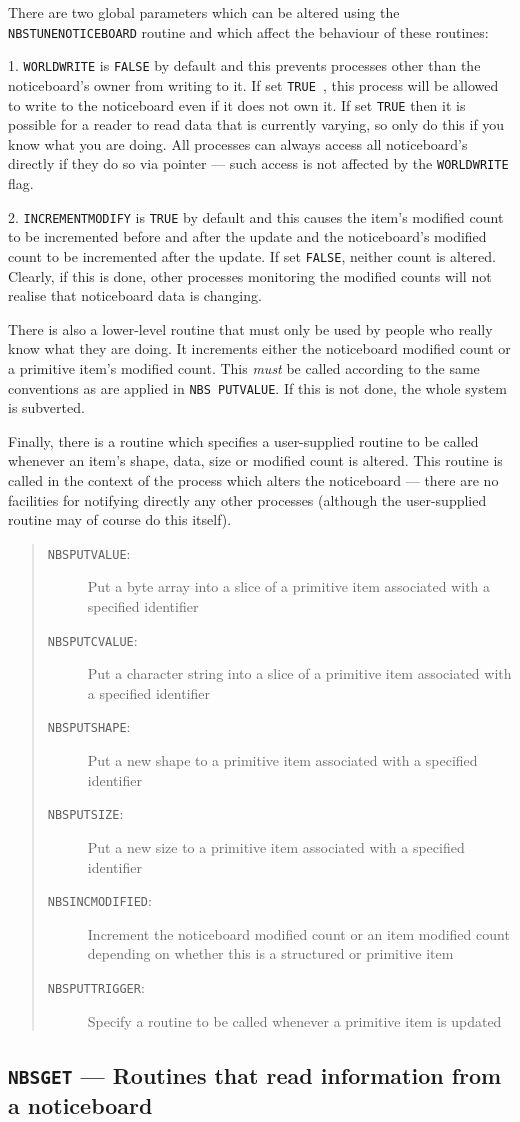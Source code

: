 \documentclass[twoside,11pt]{article}
\renewcommand{\_}{\texttt{\symbol{95}}}
\newcommand{\mansection}[2]{\subsection{#1 --- #2}}
\newenvironment{mansectionroutines}{\begin{quote}\begin{description}}%
{\end{description}\end{quote}}
\newcommand{\mansectionitem}[1]{\item[#1:]\mbox{}}
\newcommand{\mantt}{\tt}
\begin{document}
      There are two global parameters which can be altered using the
      {\mantt{NBS\_TUNE\_NOTICEBOARD}} routine and which affect the behaviour %
of these
      routines:

      1. {\mantt{WORLD\_WRITE}} is {\mantt{FALSE}} by default and this %
prevents processes other
         than the noticeboard's owner from writing to it. If set {\mantt{TRUE}%
}, this
         process will be allowed to write to the noticeboard even if it does
         not own it. If set {\mantt{TRUE}} then it is possible for a reader %
to read data
         that is currently varying, so only do this if you know what you are
         doing. All processes can always access all noticeboard's directly if
         they do so via pointer --- such access is not affected by the
         {\mantt{WORLD\_WRITE}} flag.

      2. {\mantt{INCREMENT\_MODIFY}} is {\mantt{TRUE}} by default and this %
causes the item's
         modified count to be incremented before and after the update and the
         noticeboard's modified count to be incremented after the update. If
         set {\mantt{FALSE}}, neither count is altered. Clearly, if this is %
done, other
         processes monitoring the modified counts will not realise that
         noticeboard data is changing.

      There is also a lower-level routine that must only be used by people who
      really know what they are doing. It increments either the noticeboard
      modified count or a primitive item's modified count. This {\em must} be
      called according to the same conventions as are applied in {\mantt{NBS\_%
PUT\_VALUE}}.
      If this is not done, the whole system is subverted.

      Finally, there is a routine which specifies a user-supplied routine to be
      called whenever an item's shape, data, size or modified count is altered.
      This routine is called in the context of the process which alters the
      noticeboard --- there are no facilities for notifying directly any other
      processes (although the user-supplied routine may of course do this
      itself).

\begin{mansectionroutines}
\mansectionitem {{\mantt{NBS\_PUT\_VALUE}}}
      Put a byte array into a slice of a primitive item
      associated with a specified identifier
\mansectionitem {{\mantt{NBS\_PUT\_CVALUE}}}
      Put a character string into a slice of a primitive item
      associated with a specified identifier
\mansectionitem {{\mantt{NBS\_PUT\_SHAPE}}}
      Put a new shape to a primitive item
      associated with a specified identifier
\mansectionitem {{\mantt{NBS\_PUT\_SIZE}}}
      Put a new size to a primitive item
      associated with a specified identifier
\mansectionitem {{\mantt{NBS\_INC\_MODIFIED}}}
      Increment the noticeboard modified count or an item modified count
      depending on whether this is a structured or primitive item
\mansectionitem {{\mantt{NBS\_PUT\_TRIGGER}}}
      Specify a routine to be called whenever a primitive item is updated
\end{mansectionroutines}
\mansection {{\mantt{NBS\_GET}}}{      Routines that read information from a %
noticeboard}
\end{document}
